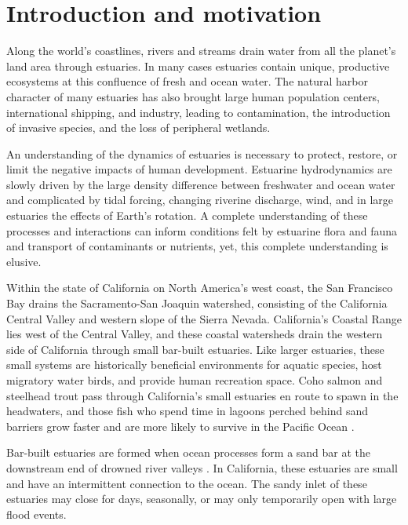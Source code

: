 \chapter{Introduction and motivation}
\label{chIntro}

Along the world's coastlines, rivers and streams drain water from all the planet's land area through estuaries.  In many cases estuaries contain unique, productive ecosystems at this confluence of fresh and ocean water. The natural harbor character of many estuaries has also brought large human population centers, international shipping, and industry, leading to contamination, the introduction of invasive species, and the loss of peripheral wetlands. 

An understanding of the dynamics of estuaries is necessary to protect, restore, or limit the negative impacts of human development. Estuarine hydrodynamics are slowly driven by the large density difference between freshwater and ocean water and complicated by tidal forcing, changing riverine discharge, wind, and in large estuaries the effects of Earth's rotation. A complete understanding of these processes and interactions can inform conditions felt by estuarine flora and fauna and transport of contaminants or nutrients, yet, this complete understanding is elusive.

Within the state of California on North America's west coast, the San Francisco Bay drains the Sacramento-San Joaquin watershed, consisting of the California Central Valley and western slope of the Sierra Nevada. California's Coastal Range lies west of the Central Valley, and these coastal watersheds drain the western side of California through small bar-built estuaries. Like larger estuaries, these small systems are historically beneficial environments for aquatic species, host migratory water birds, and provide human recreation space. Coho salmon and steelhead trout pass through California's small estuaries en route to spawn in the headwaters, and those fish who spend time in lagoons perched behind sand barriers grow faster and are more likely to survive in the Pacific Ocean \parencite{hayes_steelhead_2008, bond_marine_2008}. 

Bar-built estuaries are formed when ocean processes form a sand bar at the downstream end of drowned river valleys \parencite{nielsen_coastal_2009}. In California, these estuaries are small and have an intermittent connection to the ocean. The sandy inlet of these estuaries may close for days, seasonally, or may only temporarily open with large flood events. 

